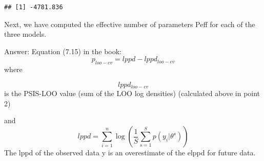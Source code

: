 \documentclass[]{article}
\newenvironment{Shaded}{\begin{snugshade}}{\end{snugshade}}
\newcommand{\KeywordTok}[1]{\textcolor[rgb]{0.13,0.29,0.53}{\textbf{#1}}}
\newcommand{\DecValTok}[1]{\textcolor[rgb]{0.00,0.00,0.81}{#1}}
\newcommand{\CommentTok}[1]{\textcolor[rgb]{0.56,0.35,0.01}{\textit{#1}}}
\newcommand{\ControlFlowTok}[1]{\textcolor[rgb]{0.13,0.29,0.53}{\textbf{#1}}}
\newcommand{\OperatorTok}[1]{\textcolor[rgb]{0.81,0.36,0.00}{\textbf{#1}}}
\newcommand{\NormalTok}[1]{#1}
\begin{document}
\begin{verbatim}
## [1] -4781.836
\end{verbatim}

Next, we have computed the effective number of parameters Peff for each
of the three models.

Answer: Equation (7.15) in the book:
\[ p_{loo-cv} = lppd - lppd_{loo-cv} \] where

\[ lppd_{loo-cv} \] is the PSIS-LOO value (sum of the LOO log densities)
(calculated above in point 2)

and
\[ lppd = \sum_{i=1}^n \log( \frac{1}{S} \sum_{s=1}^S p(y_i|\theta^s))\]
The lppd of the observed data y is an overestimate of the elppd for
future data.

\begin{Shaded}
\end{Shaded}
\end{document}
